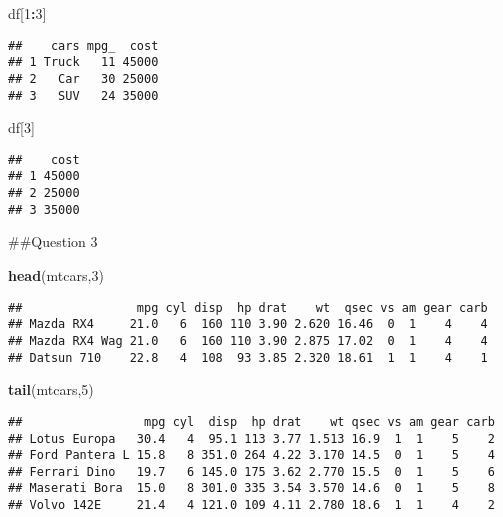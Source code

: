 \documentclass[
]{article}
\newenvironment{Shaded}{\begin{snugshade}}{\end{snugshade}}
\newcommand{\DecValTok}[1]{\textcolor[rgb]{0.00,0.00,0.81}{#1}}
\newcommand{\FunctionTok}[1]{\textcolor[rgb]{0.13,0.29,0.53}{\textbf{#1}}}
\newcommand{\NormalTok}[1]{#1}
\newcommand{\SpecialCharTok}[1]{\textcolor[rgb]{0.81,0.36,0.00}{\textbf{#1}}}
\begin{document}
\begin{Shaded}
\begin{Highlighting}[]
\NormalTok{df[}\DecValTok{1}\SpecialCharTok{:}\DecValTok{3}\NormalTok{]}
\end{Highlighting}
\end{Shaded}

\begin{verbatim}
##    cars mpg_  cost
## 1 Truck   11 45000
## 2   Car   30 25000
## 3   SUV   24 35000
\end{verbatim}

\begin{Shaded}
\begin{Highlighting}[]
\NormalTok{df[}\DecValTok{3}\NormalTok{]}
\end{Highlighting}
\end{Shaded}

\begin{verbatim}
##    cost
## 1 45000
## 2 25000
## 3 35000
\end{verbatim}

\#\#Question 3

\begin{Shaded}
\begin{Highlighting}[]
\FunctionTok{head}\NormalTok{(mtcars,}\DecValTok{3}\NormalTok{)}
\end{Highlighting}
\end{Shaded}

\begin{verbatim}
##                mpg cyl disp  hp drat    wt  qsec vs am gear carb
## Mazda RX4     21.0   6  160 110 3.90 2.620 16.46  0  1    4    4
## Mazda RX4 Wag 21.0   6  160 110 3.90 2.875 17.02  0  1    4    4
## Datsun 710    22.8   4  108  93 3.85 2.320 18.61  1  1    4    1
\end{verbatim}

\begin{Shaded}
\begin{Highlighting}[]
\FunctionTok{tail}\NormalTok{(mtcars,}\DecValTok{5}\NormalTok{)}
\end{Highlighting}
\end{Shaded}

\begin{verbatim}
##                 mpg cyl  disp  hp drat    wt qsec vs am gear carb
## Lotus Europa   30.4   4  95.1 113 3.77 1.513 16.9  1  1    5    2
## Ford Pantera L 15.8   8 351.0 264 4.22 3.170 14.5  0  1    5    4
## Ferrari Dino   19.7   6 145.0 175 3.62 2.770 15.5  0  1    5    6
## Maserati Bora  15.0   8 301.0 335 3.54 3.570 14.6  0  1    5    8
## Volvo 142E     21.4   4 121.0 109 4.11 2.780 18.6  1  1    4    2
\end{verbatim}
\end{document}
